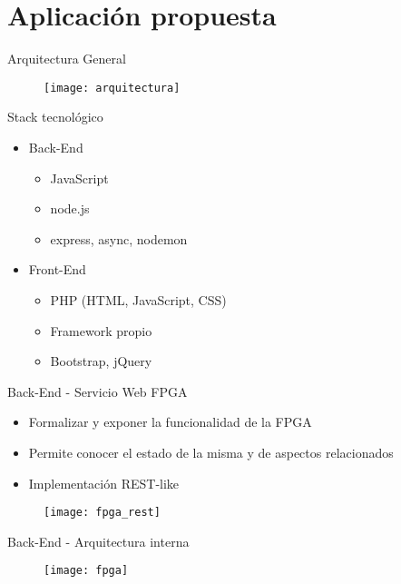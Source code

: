 \section{Aplicación propuesta}

\begin{frame}{Arquitectura General}
  \begin{figure}
    \texttt{[image: arquitectura]}
  \end{figure}
\end{frame}

\begin{frame}{Stack tecnológico}
  \begin{itemize}
    \item\alert<+>{Back-End}
    \begin{itemize}
      \item JavaScript
      \item node.js
      \item express, async, nodemon
    \end{itemize}
    \item\alert<+>{Front-End}
    \begin{itemize}
      \item PHP (HTML, JavaScript, CSS)
      \item Framework propio
      \item Bootstrap, jQuery
    \end{itemize}
  \end{itemize}
\end{frame}

\begin{frame}{Back-End - Servicio Web FPGA}
  \begin{itemize}[<alert@+>]
    \item Formalizar y exponer la funcionalidad de la FPGA
    \item Permite conocer el estado de la misma y de aspectos relacionados
    \item Implementación REST-like
  \end{itemize}
  \begin{figure}
    \texttt{[image: fpga\_rest]}
  \end{figure}
\end{frame}

\begin{frame}{Back-End - Arquitectura interna}
  \begin{figure}
    \texttt{[image: fpga]}
  \end{figure}
\end{frame}

